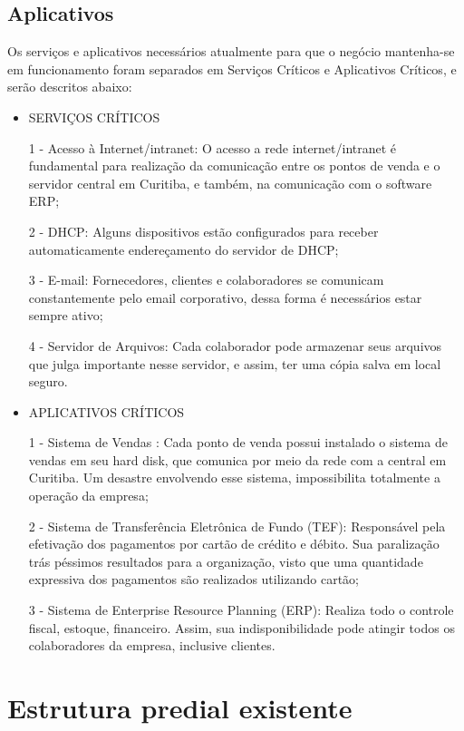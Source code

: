 \documentclass[	DIV=calc,%
							paper=a4,%
							fontsize=12pt,%
							onecolumn]{scrartcl}	 					%
\begin{document}
\subsection{Aplicativos}
Os serviços e aplicativos necessários atualmente para que o negócio mantenha-se em funcionamento foram separados em Serviços Críticos e Aplicativos Críticos, e serão descritos abaixo:
\begin{itemize}
	\item SERVIÇOS CRÍTICOS
	
		1 - Acesso à Internet/intranet: O acesso a rede internet/intranet é fundamental para realização da comunicação entre os pontos de venda e o servidor central em Curitiba, e também, na comunicação com o software ERP;
		
		2 - DHCP: Alguns dispositivos estão configurados para receber automaticamente endereçamento do servidor de DHCP;
		
		3 - E-mail: Fornecedores, clientes e colaboradores se comunicam constantemente pelo email corporativo, dessa forma é necessários estar sempre ativo;
		
		4 - Servidor de Arquivos: Cada colaborador pode armazenar seus arquivos que julga importante nesse servidor, e assim, ter uma cópia salva em local seguro.
		
	\item APLICATIVOS CRÍTICOS
	
		1 - Sistema de Vendas : Cada ponto de venda possui instalado o sistema de vendas em seu hard disk, que comunica por meio da rede com a central em Curitiba. Um desastre envolvendo esse sistema, impossibilita totalmente a operação da empresa;
		
		2 - Sistema de Transferência Eletrônica de Fundo (TEF): Responsável pela efetivação dos pagamentos por cartão de crédito e débito. Sua paralização trás péssimos resultados para a organização, visto que uma quantidade expressiva dos pagamentos são realizados utilizando cartão;
		
		3 - Sistema de Enterprise Resource Planning (ERP): Realiza todo o controle fiscal, estoque, financeiro. Assim, sua indisponibilidade pode atingir todos os colaboradores da empresa, inclusive clientes.
		
\end{itemize}


\section{Estrutura predial existente}
\end{document}
